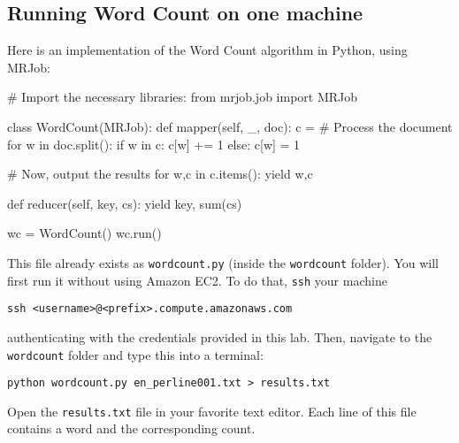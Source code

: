 \subsection{Running Word Count on one machine}

Here is an implementation of the Word Count algorithm in Python, using MRJob:

\begin{python}
# Import the necessary libraries:
from mrjob.job import MRJob

class WordCount(MRJob):
    def mapper(self, _, doc):
        c = {}
        # Process the document
        for w in doc.split():
            if w in c:
                c[w] += 1
            else:
                c[w] = 1

        # Now, output the results
        for w,c in c.items():
            yield w,c

    def reducer(self, key, cs):
        yield key, sum(cs)

wc = WordCount()
wc.run()
\end{python}

This file already exists as \texttt{wordcount.py} (inside the
\texttt{wordcount} folder). You will first run it without using Amazon
EC2. To do that, {\texttt{ssh}} your machine
\begin{verbatim}
ssh <username>@<prefix>.compute.amazonaws.com
\end{verbatim}
authenticating with the credentials provided in this lab.
Then, navigate to the \texttt{wordcount} folder and type this into a terminal:

\begin{verbatim}
python wordcount.py en_perline001.txt > results.txt
\end{verbatim}

Open the \texttt{results.txt} file in your favorite text editor. Each line of this file contains a word and the corresponding count.

